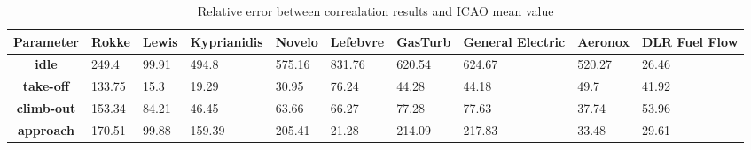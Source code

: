 \begin{table}[h!]
  \centering
  \begin{tabularx}{\textwidth}{||c|X|X|X|X|X|X|X|X|X||}
  \hline
    \cellcolor{gray!20}\textbf{Parameter} & \cellcolor{gray!20}\textbf{Rokke} & \cellcolor{gray!20}\textbf{Lewis} & \cellcolor{gray!20}\textbf{Kyprianidis} & \cellcolor{gray!20}\textbf{Novelo} & \cellcolor{gray!20}\textbf{Lefebvre} & \cellcolor{gray!20}\textbf{GasTurb} & \cellcolor{gray!20}\textbf{General Electric} & \cellcolor{gray!20}\textbf{Aeronox} & \cellcolor{gray!20}\textbf{DLR Fuel Flow} \\ [0.5ex]
  \hline\hline
\centering
    \cellcolor{gray!20}\textbf{idle} & 249.4 & 99.91 & 494.8 & 575.16 & 831.76 & 620.54 & 624.67 & 520.27 & 26.46 \\
  \hline
    \cellcolor{gray!20}\textbf{take-off} & 133.75 & 15.3 & 19.29 & 30.95 & 76.24 & 44.28 & 44.18 & 49.7 & 41.92 \\
  \hline
    \cellcolor{gray!20}\textbf{climb-out} & 153.34 & 84.21 & 46.45 & 63.66 & 66.27 & 77.28 & 77.63 & 37.74 & 53.96 \\
  \hline
    \cellcolor{gray!20}\textbf{approach} & 170.51 & 99.88 & 159.39 & 205.41 & 21.28 & 214.09 & 217.83 & 33.48 & 29.61 \\
  \hline
  \end{tabularx}
  \caption{Relative error between correalation results and ICAO mean value}
  \label{tab:relec}
\end{table}

